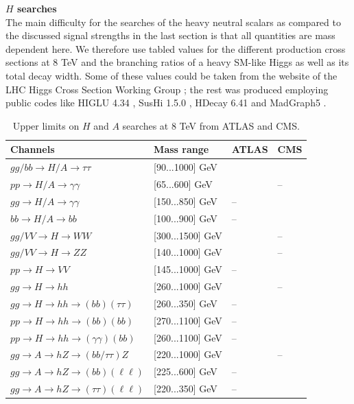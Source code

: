 \documentclass[aps,superscriptaddress,nofootinbib,floatfix,notitlepage]{revtex4-1}
\begin{document}
\textbf{$H$ searches}\\

The main difficulty for the searches of the heavy neutral scalars as compared to the discussed signal strengths in the last section is that all quantities are mass dependent here. We therefore use tabled values for the different production cross sections at 8 TeV and the branching ratios of a heavy SM-like Higgs as well as its total decay width. Some of these values could be taken from the website of the LHC Higgs Cross Section Working Group \cite{LHCHXSWG}; the rest was produced employing public codes like HIGLU 4.34 \cite{Spira:1995mt}, SusHi 1.5.0 \cite{Harlander:2012pb}, HDecay 6.41 \cite{Djouadi:1997yw} and MadGraph5 \cite{Alwall:2014hca}.

\begin{table}[tb]
 \centering
 \caption{Upper limits on $H$ and $A$ searches at 8 TeV from ATLAS and CMS.}\vspace{0.2cm}
  \begin{tabular}{|l|l|l|l|}
    \hline
      Channels & Mass range & ATLAS & CMS\\
    \hline
      $gg/bb \to H/A \to \tau \tau $ & [90...1000] GeV & \cite{Aad:2014vgg} & \cite{CMS:2015mca} \\
    \hline
      $pp\to H/A \to \gamma \gamma $ & [65...600] GeV & \cite{Aad:2014ioa} & --\\
    \hline
      $gg\to H/A \to \gamma \gamma $ & [150...850] GeV & -- & \cite{Khachatryan:2015qba}\\
    \hline
      $bb\to H/A \to bb$ & [100...900] GeV &  -- & \cite{Khachatryan:2015tra}\\
    \hline
      $gg/VV \to H\to WW$ & [300...1500] GeV & \cite{Aad:2015agg} & --\\
    \hline
      $gg/VV \to H\to ZZ$ & [140...1000] GeV & \cite{Aad:2015kna} & --\\
    \hline
      $pp\to H\to VV$ & [145...1000] GeV & -- & \cite{Khachatryan:2015cwa}\\
    \hline
      $gg\to H\to hh$ & [260...1000] GeV & \cite{Aad:2015xja} & --\\
    \hline
      $gg\to H\to hh\to (bb)(\tau \tau )$ & [260...350] GeV & -- & \cite{Khachatryan:2015tha}\\
    \hline
      $pp\to H\to hh\to (bb)(bb)$ & [270...1100] GeV & -- & \cite{Khachatryan:2015yea}\\
    \hline
      $pp\to H\to hh\to (\gamma \gamma )(bb)$ & [260...1100] GeV & -- & \cite{CMS:2014ipa}\\
    \hline
      $gg\to A\to hZ\to (bb/\tau \tau )Z$ & [220...1000] GeV & \cite{Aad:2015wra} & --\\
    \hline
      $gg\to A\to hZ\to (bb)(\ell \ell )$ & [225...600] GeV & -- & \cite{Khachatryan:2015lba}\\
    \hline
      $gg\to A\to hZ\to (\tau \tau )(\ell \ell )$ & [220...350] GeV & -- & \cite{Khachatryan:2015tha}\\
    \hline
  \end{tabular}
 \label{tab:HandAsearchlimits}
\end{table} 
\end{document}
